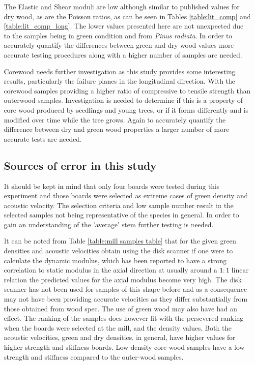 \documentclass[10pt]{article}
\begin{document}
The Elastic and Shear moduli are low although similar to published values for dry wood, as are the Poisson ratios, as can be seen in Tables \ref{table:lit_comp} and \ref{table:lit_comp_long}. The lower values presented here are not unexpected due to the samples being in green condition and from \textit{Pinus radiata}. In order to accurately quantify the differences between green and dry wood values more accurate testing procedures along with a higher number of samples are needed.

Corewood needs further investigation as this study provides some interesting results, particularly the failure planes in the longitudinal direction. With the corewood samples providing a higher ratio of compressive to tensile strength than outerwood samples. Investigation is needed to determine if this is a property of core wood produced by seedlings and young trees, or if it forms differently and is modified over time while the tree grows. Again to accurately quantify the difference between dry and green wood properties a larger number of more accurate tests are needed.


\subsection{Sources of error in this study}
\label{sec:dis_error}

It should be kept in mind that only four boards were tested during this experiment and those boards were selected as extreme cases of green density and acoustic velocity. The selection criteria and low sample number result in the selected samples not being representative of the species in general. In order to gain an understanding of the 'average' stem further testing is needed.

It can be noted from Table \ref{table:mill samples table} that for the given green densities and acoustic velocities obtain using the disk scanner if one were to calculate the dynamic modulus, which has been reported to have a strong correlation to static modulus in the axial direction \citep{lindstrom_stiffness_2004,lindstrom_methods_2002} at usually around a \(1:1\) linear relation the predicted values for the axial modulus become very high. The disk scanner has not been used for samples of this shape before and as a consequence may not have been providing accurate velocities as they differ substantially from those obtained from wood spec.  The use of green wood may also have had an effect. The ranking of the samples does however fit with the persevered ranking when the boards were selected at the mill, and the density values. Both the acoustic velocities, green and dry densities, in general, have higher values for higher strength and stiffness boards. Low density core-wood samples have a low strength and stiffness compared to the outer-wood samples.
\end{document}
